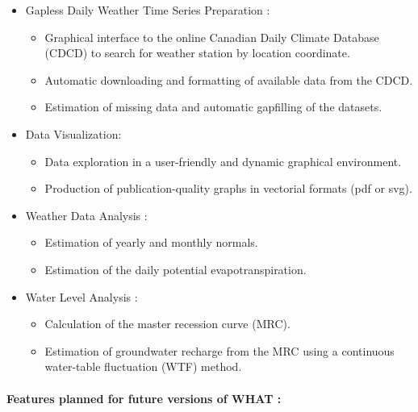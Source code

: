 \documentclass[WHATMANUAL.tex]{subfiles}
\begin{document}
\begin{itemize}

\item Gapless Daily Weather Time Series Preparation :
   
    \begin{itemize}    
        \item Graphical interface to the online Canadian Daily Climate Database (CDCD) to search for weather station by location coordinate.
        \item Automatic downloading and formatting of available data from the CDCD.
        \item Estimation of missing data and automatic gapfilling of the datasets.
    \end{itemize}
 
\item Data Visualization:

    \begin{itemize}
        \item Data exploration in a user-friendly and dynamic graphical environment.
        \item Production of publication-quality graphs in vectorial formats (pdf or svg).
    \end{itemize}

\item Weather Data Analysis :

    \begin{itemize}
        \item Estimation of yearly and monthly normals.
        \item Estimation of the daily potential evapotranspiration.
    \end{itemize}
\newpage
\item Water Level Analysis :

    \begin{itemize}
        \item Calculation of the master recession curve (MRC).
        \item Estimation of groundwater recharge from the MRC using a continuous water-table fluctuation (WTF) method.
    \end{itemize}

\end{itemize}

\paragraph*{Features planned for future versions of WHAT :}
\end{document}
